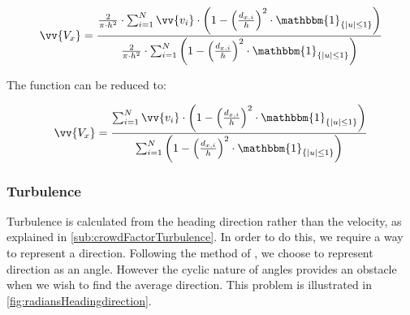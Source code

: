 \begin{equation}
\vv{V_x} = \frac{\frac{2}{\pi \cdot h^2} \cdot \sum_{i=1}^N \vv{v_i} \cdot \left(1-\left(\frac{d_{x,i}}{h}\right)^2 \cdot \mathbbm{1}_{\{|u| \leq 1\} }\right)}{\frac{2}{\pi \cdot h^2} \cdot \sum_{i=1}^N \left(1-\left(\frac{d_{x,i}}{h}\right)^2 \cdot \mathbbm{1}_{\{|u| \leq 1\} }\right)}
\end{equation}

The function can be reduced to:

\begin{equation}
\vv{V_x} = \frac{\sum_{i=1}^N \vv{v_i} \cdot \left(1-\left(\frac{d_{x,i}}{h}\right)^2 \cdot \mathbbm{1}_{\{|u| \leq 1\} }\right)}{\sum_{i=1}^N \left(1-\left(\frac{d_{x,i}}{h}\right)^2 \cdot \mathbbm{1}_{\{|u| \leq 1\} }\right)}
\end{equation}

\subsubsection{Turbulence}\label{subsub:turbu}
Turbulence is calculated from the heading direction rather than the velocity, as explained in \cref{sub:crowdFactorTurbulence}. In order to do this, we require a way to represent a direction. Following the method of \citet{localTrendStatistics}, we choose to represent direction as an angle. However the cyclic nature of angles provides an obstacle when we wish to find the average direction. This problem is illustrated in \cref{fig:radiansHeadingdirection}.


